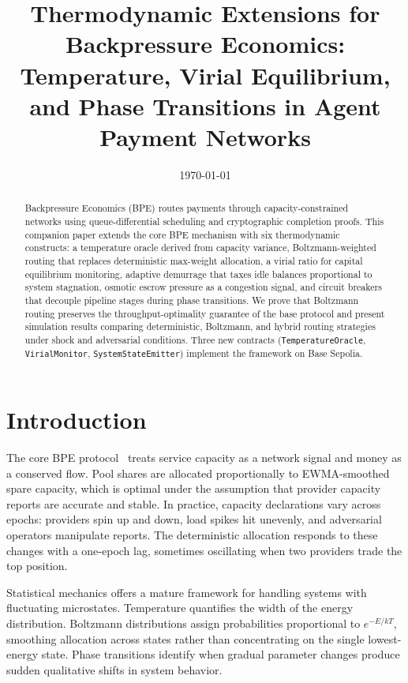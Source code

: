 \documentclass[11pt]{article}
\title{\textbf{Thermodynamic Extensions for Backpressure Economics:} \\
Temperature, Virial Equilibrium, and Phase Transitions in Agent Payment Networks}
\author{}
\date{\today}
\theoremstyle{definition}
\theoremstyle{remark}
\begin{document}
\maketitle

\begin{abstract}
Backpressure Economics (BPE) routes payments through capacity-constrained
networks using queue-differential scheduling and cryptographic completion
proofs. This companion paper extends the core BPE mechanism with six
thermodynamic constructs: a temperature oracle derived from capacity variance,
Boltzmann-weighted routing that replaces deterministic max-weight allocation,
a virial ratio for capital equilibrium monitoring, adaptive demurrage that
taxes idle balances proportional to system stagnation, osmotic escrow pressure
as a congestion signal, and circuit breakers that decouple pipeline stages
during phase transitions. We prove that Boltzmann routing preserves the
throughput-optimality guarantee of the base protocol and present simulation
results comparing deterministic, Boltzmann, and hybrid routing strategies
under shock and adversarial conditions. Three new contracts
(\texttt{TemperatureOracle}, \texttt{VirialMonitor},
\texttt{SystemStateEmitter}) implement the framework on Base Sepolia.
\end{abstract}

\section{Introduction}

The core BPE protocol~\cite{bpe2025} treats service capacity as a network
signal and money as a conserved flow. Pool shares are allocated proportionally
to EWMA-smoothed spare capacity, which is optimal under the assumption that
provider capacity reports are accurate and stable. In practice, capacity
declarations vary across epochs: providers spin up and down, load spikes hit
unevenly, and adversarial operators manipulate reports. The deterministic
allocation responds to these changes with a one-epoch lag, sometimes
oscillating when two providers trade the top position.

Statistical mechanics offers a mature framework for handling systems with
fluctuating microstates. Temperature quantifies the width of the energy
distribution. Boltzmann distributions assign probabilities proportional to
$e^{-E/kT}$, smoothing allocation across states rather than concentrating
on the single lowest-energy state. Phase transitions identify when gradual
parameter changes produce sudden qualitative shifts in system behavior.
\end{document}
